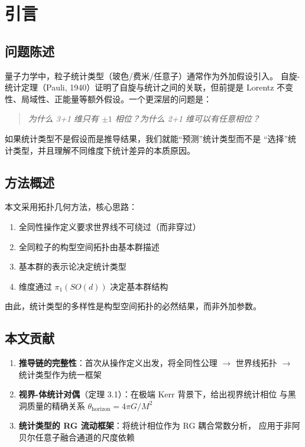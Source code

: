 \documentclass[11pt,a4paper]{article}
\begin{document}
\tableofcontents

\section{引言}

\subsection{问题陈述}

量子力学中，粒子统计类型（玻色/费米/任意子）通常作为外加假设引入。
自旋-统计定理（Pauli, 1940）证明了自旋与统计之间的关联，但前提是
Lorentz 不变性、局域性、正能量等额外假设。一个更深层的问题是：

\begin{quote}
\textit{为什么 3+1 维只有 $\pm 1$ 相位？为什么 2+1 维可以有任意相位？}
\end{quote}

如果统计类型不是假设而是推导结果，我们就能``预测''统计类型而不是
``选择''统计类型，并且理解不同维度下统计差异的本质原因。

\subsection{方法概述}

本文采用拓扑几何方法，核心思路：

\begin{enumerate}
\item 全同性操作定义要求世界线不可绕过（而非穿过）
\item 全同粒子的构型空间拓扑由基本群描述
\item 基本群的表示论决定统计类型
\item 维度通过 $\pi_1(SO(d))$ 决定基本群结构
\end{enumerate}

由此，统计类型的多样性是构型空间拓扑的必然结果，而非外加参数。

\subsection{本文贡献}

\begin{enumerate}
\item \textbf{推导链的完整性}：首次从操作定义出发，将全同性公理 $\rightarrow$
世界线拓扑 $\rightarrow$ 统计类型作为统一框架
\item \textbf{视界-体统计对偶}（定理 3.1）：在极端 Kerr 背景下，给出视界统计相位
与黑洞质量的精确关系 $\theta_{\text{horizon}} = 4\pi G/M^2$
\item \textbf{统计类型的 RG 流动框架}：将统计相位作为 RG 耦合常数分析，
应用于非阿贝尔任意子融合通道的尺度依赖
\end{enumerate}
\end{document}
